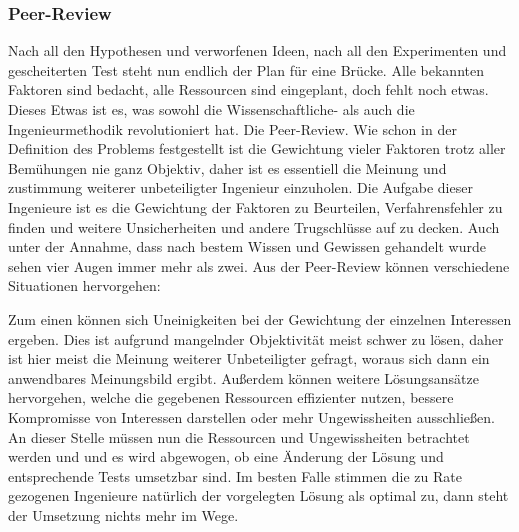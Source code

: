     \subsubsection{Peer-Review}

    Nach all den Hypothesen und verworfenen Ideen, nach all den Experimenten und 
    gescheiterten Test steht nun endlich der Plan für eine Brücke. Alle bekannten Faktoren 
    sind bedacht, alle Ressourcen sind eingeplant, doch fehlt noch etwas. Dieses Etwas ist 
    es, was sowohl die Wissenschaftliche- als auch die Ingenieurmethodik revolutioniert hat. 
    Die Peer-Review.
    Wie schon in der Definition des Problems festgestellt ist die Gewichtung vieler Faktoren 
    trotz aller Bemühungen nie ganz Objektiv, daher ist es essentiell die Meinung und zustimmung 
    weiterer unbeteiligter Ingenieur einzuholen. Die Aufgabe dieser Ingenieure ist es die Gewichtung 
    der Faktoren zu Beurteilen, Verfahrensfehler zu finden und weitere Unsicherheiten und andere 
    Trugschlüsse auf zu decken. Auch unter der Annahme, dass nach bestem Wissen und Gewissen gehandelt 
    wurde sehen vier Augen immer mehr als zwei. Aus der Peer-Review können verschiedene Situationen 
    hervorgehen:
    
    Zum einen können sich Uneinigkeiten bei der Gewichtung der einzelnen Interessen ergeben. 
    Dies ist aufgrund mangelnder Objektivität meist schwer zu lösen, daher ist hier meist die 
    Meinung weiterer Unbeteiligter gefragt, woraus sich dann ein anwendbares Meinungsbild ergibt. 
    Außerdem können weitere Lösungsansätze hervorgehen, welche die gegebenen Ressourcen effizienter 
    nutzen, bessere Kompromisse von Interessen darstellen oder mehr Ungewissheiten ausschließen. 
    An dieser Stelle müssen nun die Ressourcen und Ungewissheiten betrachtet werden und und es 
    wird abgewogen, ob eine Änderung der Lösung und entsprechende Tests umsetzbar sind.
    Im besten Falle stimmen die zu Rate gezogenen Ingenieure natürlich der vorgelegten Lösung als 
    optimal zu, dann steht der Umsetzung nichts mehr im Wege.

